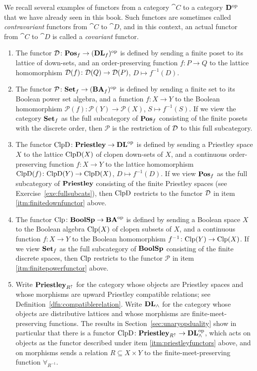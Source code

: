 \begin{example}
  \label{exa:cat-functor-examples}
We recall several examples of functors from a category $\cat{C}$ to a category $\mathbf{D}^{\mathrm{op}}$ that we have already seen in this book. Such functors are sometimes called \emph{contravariant} functors from $\cat{C}$ to $\cat{D}$, and in this context, an actual functor from $\cat{C}$ to $\cat{D}$ is called a \emph{covariant} functor. %
\begin{enumerate}
  \item\label{itm:finitedownfunctor} The functor $\mathcal{D} \colon \mathbf{Pos}_{f} \to (\mathbf{DL}_{f})^{\mathrm{op}}$ is defined by sending a finite poset to its lattice of down-sets, and an order-preserving function $f \colon P \to Q$ to the lattice homomorphism $\mathcal{D}(f) \colon \mathcal{D}(Q) \to \mathcal{D}(P)$, $D \mapsto f^{-1}(D)$.
\item\label{itm:finitepowerfunctor} The functor $\mathcal{P} \colon \mathbf{Set}_{f} \to (\mathbf{BA}_{f})^{\mathrm{op}}$ is defined by sending a finite set to its Boolean power set algebra, and a function $f \colon X \to Y$ to the Boolean homomorphism $\mathcal{P}(f) \colon \mathcal{P}(Y) \to \mathcal{P}(X)$, $S \mapsto f^{-1}(S)$. If we view the category $\mathbf{Set}_{f}$ as the full subcategory of $\mathbf{Pos}_{f}$ consisting of the finite posets with the discrete order, then $\mathcal{P}$ is the restriction of $\mathcal{D}$ to this full subcategory.
\item \label{itm:priestleyfunctors} The functor $\mathrm{ClpD} \colon \mathbf{Priestley} \to \mathbf{DL}^{\mathrm{op}}$ is defined by sending a Priestley space $X$ to the lattice $\mathrm{ClpD}(X)$ of clopen down-sets of $X$, and a continuous order-preserving function $f \colon X \to Y$ to the lattice homomorphism $\mathrm{ClpD}(f) \colon \mathrm{ClpD}(Y) \to \mathrm{ClpD}(X)$, $D \mapsto f^{-1}(D)$. If we view $\mathbf{Pos}_{f}$ as the full subcategory of $\mathbf{Priestley}$ consisting of the finite Priestley spaces (see Exercise~\ref{exe:fullsubcats}), then $\mathrm{ClpD}$ restricts to the functor $\mathcal{D}$ in item \ref{itm:finitedownfunctor} above.
\item The functor $\mathrm{Clp} \colon \mathbf{BoolSp} \to \mathbf{BA}^{\mathrm{op}}$ is defined by sending a Boolean space $X$ to the Boolean algebra $\mathrm{Clp}(X)$ of clopen subsets of $X$, and a continuous function $f \colon X \to Y$ to the Boolean homomorphism $f^{-1} \colon \mathrm{Clp}(Y) \to \mathrm{Clp}(X)$. If we view $\mathbf{Set}_{f}$ as the full subcategory of $\mathbf{BoolSp}$ consisting of the finite discrete spaces, then $\mathrm{Clp}$ restricts to the functor $\mathcal{P}$ in item \ref{itm:finitepowerfunctor} above.
\item \label{itm:priestley-compatible-functor} Write $\mathbf{Priestley}_{R^{\uparrow}}$ for the category whose objects are Priestley spaces and whose morphisms are upward Priestley compatible relations; see Definition~\ref{dfn:compatiblerelation}. Write $\mathbf{DL}_{\wedge}$ for the category whose objects are distributive lattices and whose morphisms are finite-meet-preserving functions. The results in Section~\ref{sec:unaryopduality} show in particular that there is a functor $\mathrm{ClpD} \colon \mathbf{Priestley}_{R^{\uparrow}} \to \mathbf{DL}_{\wedge}^{\mathrm{op}}$, which acts on objects as the functor described under item \ref{itm:priestleyfunctors} above, and on morphisms sends a relation $R \subseteq X \times Y$ to the finite-meet-preserving function $\forall_{R^{-1}}$.

\end{enumerate}
\end{example}
